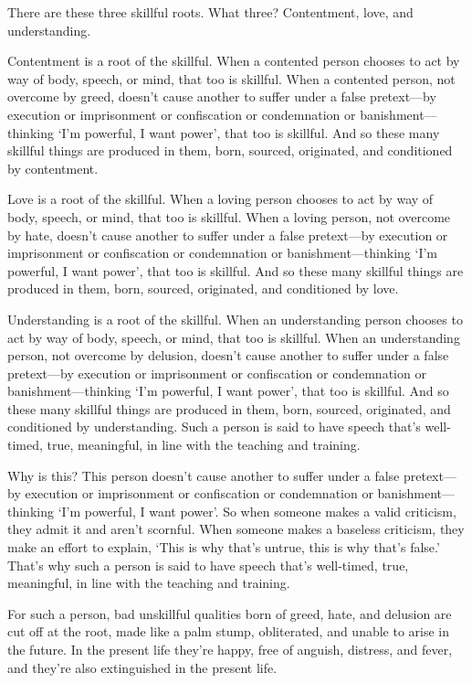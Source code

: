 \documentclass[12pt,openany]{book}%
\begin{document}
There are these three skillful roots. What three? Contentment, love, and understanding. 

Contentment is a root of the skillful. When a contented person chooses to act by way of body, speech, or mind, that too is skillful. When a contented person, not overcome by greed, doesn’t cause another to suffer under a false pretext—by execution or imprisonment or confiscation or condemnation or banishment—thinking ‘I’m powerful, I want power’, that too is skillful. And so these many skillful things are produced in them, born, sourced, originated, and conditioned by contentment. 

Love is a root of the skillful. When a loving person chooses to act by way of body, speech, or mind, that too is skillful. When a loving person, not overcome by hate, doesn’t cause another to suffer under a false pretext—by execution or imprisonment or confiscation or condemnation or banishment—thinking ‘I’m powerful, I want power’, that too is skillful. And so these many skillful things are produced in them, born, sourced, originated, and conditioned by love. 

Understanding is a root of the skillful. When an understanding person chooses to act by way of body, speech, or mind, that too is skillful. When an understanding person, not overcome by delusion, doesn’t cause another to suffer under a false pretext—by execution or imprisonment or confiscation or condemnation or banishment—thinking ‘I’m powerful, I want power’, that too is skillful. And so these many skillful things are produced in them, born, sourced, originated, and conditioned by understanding. Such a person is said to have speech that’s well-timed, true, meaningful, in line with the teaching and training. 

Why is this? This person doesn’t cause another to suffer under a false pretext—by execution or imprisonment or confiscation or condemnation or banishment—thinking ‘I’m powerful, I want power’. So when someone makes a valid criticism, they admit it and aren’t scornful. When someone makes a baseless criticism, they make an effort to explain, ‘This is why that’s untrue, this is why that’s false.’ That’s why such a person is said to have speech that’s well-timed, true, meaningful, in line with the teaching and training. 

For such a person, bad unskillful qualities born of greed, hate, and delusion are cut off at the root, made like a palm stump, obliterated, and unable to arise in the future. In the present life they’re happy, free of anguish, distress, and fever, and they’re also extinguished in the present life. 
\end{document}
